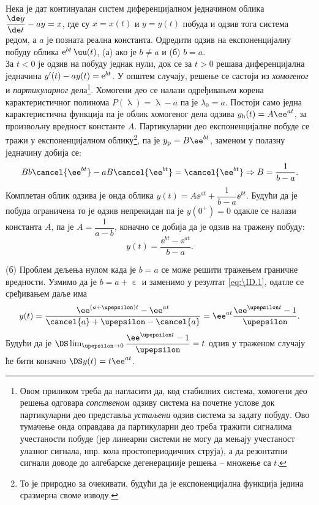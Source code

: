 \PID\mnImportant
Нека је дат континуалан систем диференцијалном једначином облика 
${\dfrac{\de y}{\de t} - ay = x}$, где су $x=x(t)$ и $y=y(t)$ побуда и одзив тога система редом, а $a$ је позната
реална константа. Одредити одзив на експоненцијалну побуду облика 
${\rm e}^{bt} \, \uu(t)$, (а) ако је $b \neq a$ и (б) $b = a$. \\[5mm]

\RESENJE  За $t < 0$ је одзив на побуду једнак нули, док се 
за $t > 0$ решава диференцијална једначина 
${y'(t) - ay(t)  = {\rm e}^{bt}}$. У општем случају, решење се састоји из 
\textit{хомогеног} и \textit{партикуларног} дела\footnote{Овом приликом треба да нагласити 
да, код стабилних система, хомогени део решења одговара \textit{сопственом} одзиву система на почетне услове
док партикуларни део представља \textit{устаљени} одзив система за задату побуду. Ово тумачење онда оправдава
да партикуларни део треба тражити сигналима учестаности побуде (јер линеарни системи не могу да мењају учестаност 
улазног сигнала, нпр. кола простопериодичних струја), а да резонтатни сигнали доводе 
до алгебарске дегенерациије решења -- множење са $t$.}. Хомогени део се налази одређивањем корена 
карактеристичног полинома $P(\uplambda) = \uplambda - a$ па је $\lambda_0 = a$. Постоји само 
једна карактеристична функција па је облик хомогеног дела одзива 
$y_{\rm h}(t) = A \ee^{at}$, за произвољну вредност константе $A$. Партикуларни део експоненцијалне побуде се тражи у 
експоненцијалном облику\footnote{То је природно за очекивати, будући да је експоненцијална функција
једина сразмерна своме изводу.}, па је $y_{\rm p} = B\ee^{bt}$, заменом у полазну једначину добија се:
\begin{equation}
    Bb\cancel{\ee^{bt}} - aB\cancel{\ee^{bt}} = \cancel{\ee^{bt}} \Rightarrow
    B = \dfrac{1}{b - a}.
\end{equation}
Комплетан облик одзива је онда облика $y(t) = A\ee^{at} + \dfrac{1}{b-a} \ee^{bt}$. Будући да је
побуда ограничена то је одзив непрекидан па је $y(0^+) = 0$ одакле се налази константа $A$, 
па је $A = \dfrac{1}{a - b}$, коначно се добија да је одзив на тражену побуду:
\begin{equation}
    y(t) = \dfrac{\ee^{bt} - \ee^{at}}{b - a}.
    \label{eq:\ID.1}
\end{equation}

(б) 
Проблем дељења нулом када је $b=a$ се може решити тражењем граничне вредности. 
Узмимо да је $b = a + \upepsilon$ 
и заменимо у резултат \ref{eq:\ID.1}, одатле се сређивањем даље има
\begin{equation}
    y(t) = \dfrac{\ee^{(a + \upepsilon)t} - \ee^{at}}{\cancel{a} + \upepsilon - \cancel{a}} = 
    \ee^{at} \dfrac{\ee^{\upepsilon t} - 1}{\upepsilon}.
\end{equation}
Будући да је $\DS \lim_{\upepsilon\to 0} \dfrac{\ee^{\upepsilon t} - 1}{\upepsilon} = t$ одзив
у траженом случају ће бити коначно 
$\DS y(t) = t \ee^{at}$.

